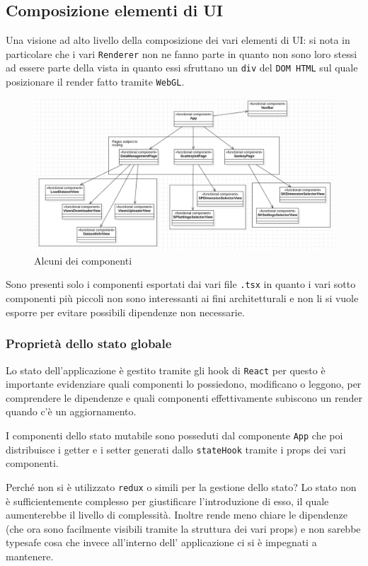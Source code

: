 \subsection{Composizione elementi di UI}
Una visione ad alto livello della composizione dei vari elementi di UI: si nota in
particolare che i vari \texttt{Renderer} non ne fanno parte in quanto non sono
loro stessi ad essere parte della vista in quanto essi sfruttano un \texttt{div}
del \texttt{DOM HTML} sul quale posizionare il render
fatto tramite \texttt{WebGL}.

\begin{figure}[h!]
  \centering
  \includegraphics[scale=0.55]{../../assets/classi_uml/vistaglobale.png}
  \caption{Alcuni dei componenti}
\end{figure}

Sono presenti solo i componenti esportati dai vari file \texttt{.tsx} in quanto i vari
sotto componenti più piccoli non sono interessanti ai fini architetturali e non li si vuole
esporre per evitare possibili dipendenze non necessarie.

\subsubsection{Proprietà dello stato globale}
Lo stato dell'applicazione è gestito tramite gli hook di \texttt{React} per questo è importante
evidenziare quali componenti lo possiedono, modificano o leggono, per comprendere le dipendenze
e quali componenti effettivamente subiscono un render quando c'è un aggiornamento.

I componenti dello stato mutabile sono posseduti dal componente \texttt{App} che poi distribuisce
i getter e i setter generati dallo \texttt{stateHook} tramite i props dei vari componenti.

Perché non si è utilizzato \texttt{redux} o simili per la gestione dello stato? Lo stato
non è sufficientemente complesso per giustificare l'introduzione di esso, il quale aumenterebbe il livello di complessità.
Inoltre rende meno chiare le dipendenze (che ora sono facilmente visibili tramite la struttura dei
vari props) e non sarebbe typesafe cosa che invece all'interno dell' applicazione
ci si è impegnati a mantenere.


